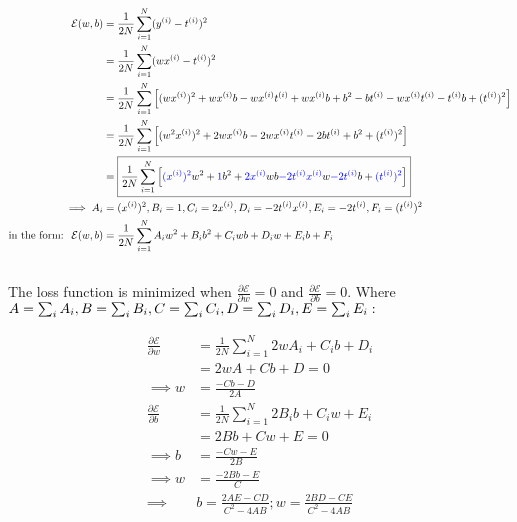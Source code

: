 \documentclass{article}
\begin{document}
\subsection{}

\begin{align*}
\mathcal{E} (w, b) &= \frac{1}{2N} \sum_{i = 1}^{N} (y^{(i)} - t^{(i)})^2 \\
&=  \frac{1}{2N} \sum_{i = 1}^{N} (wx^{(i)} - t^{(i)})^2 \\
&= \frac{1}{2N}  \sum_{i = 1}^{N}  \left[ (wx^{(i)})^2 + wx^{(i)}b -wx^{(i)} t^{(i)} + wx^{(i)}b + b^2 - bt^{(i)} - wx^{(i)}t^{(i)} - t^{(i)}b + (t^{(i)})^2 \right] \\
&= \frac{1}{2N}  \sum_{i = 1}^{N}  \left[ (w^2 x^{(i)})^2 + 2wx^{(i)} b - 2w x^{(i)} t^{(i)} - 2bt^{(i)} + b^2 + (t^{(i)})^2 \right] \\
&= \boxed{ \frac{1}{2N}  \sum_{i = 1}^{N} \left[ \textcolor{blue}{(x^{(i)})^2} w^2 + \textcolor{blue}{1}b^2 + \textcolor{blue}{2x^{(i)}}wb  \textcolor{blue}{-2t^{(i)}x^{(i)}}w \textcolor{blue}{ -2t^{(i)}}b + \textcolor{blue}{(t^{(i)})^2}	\right] }\\
\implies A_i &= (x^{(i)})^2, B_i = 1, C_i = 2x^{(i)}, D_i = -2t^{(i)}x^{(i)}, E_i = -2t^{(i)}, F_i = (t^{(i)})^2 \\
\text{in the form: } \; \mathcal{E} (w, b) &= \frac{1}{2N} \sum_{i = 1}^{N} A_i w^2 + B_i b^2 + C_i wb + D_i w + E_i b + F_i
\end{align*}

\subsection{}
\noindent The loss function is minimized when $\frac{\partial \mathcal{E}}{\partial w} = 0$ and $\frac{\partial \mathcal{E}}{\partial b} = 0$. Where $A = \sum_i A_i, \\ B =\sum_i B_i,  C =\sum_i C_i, D =\sum_i D_i, E =\sum_i E_i:$ 

\begin{align*}
\frac{\partial \mathcal{E}}{\partial w} &=  \frac{1}{2N} \sum_{i = 1}^{N} 2wA_i + C_i b + D_i \\
&= 2wA + Cb + D = 0 \\
\implies w &= \frac{-Cb - D}{2A} \\
\frac{\partial{\mathcal{E}}}{\partial b} &=  \frac{1}{2N} \sum_{i = 1}^{N} 2 B_i b + C_i w + E_i \\
&= 2Bb + Cw + E = 0 \\
\implies b &= \frac{-Cw -E}{2B} \\
\implies w &= \frac{-2Bb - E}{C} \\
\implies & \boxed{b = \frac{2AE - CD}{C^2 - 4AB} ; w = \frac{2BD - CE}{C^2 - 4AB}} 
\end{align*}
\end{document}
